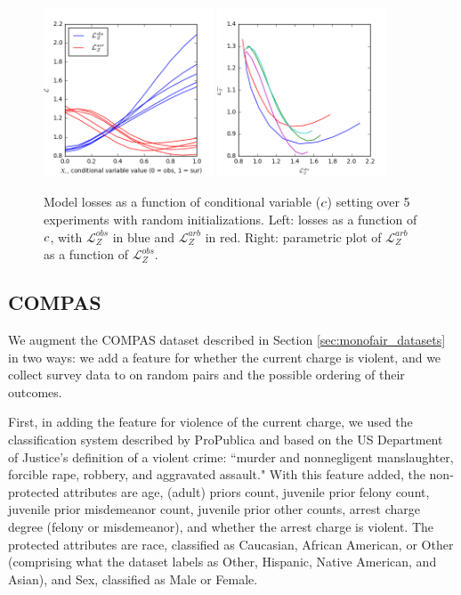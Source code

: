        \begin{figure}
            \centering
            \includegraphics[width=0.45\textwidth]{fig_softmono/synthetic_loss.png}
            \includegraphics[width=0.45\textwidth]{fig_softmono/synthetic_loss_tradeoff.png}
            \caption{
                Model losses as a function of conditional variable ($c$) setting over 5 experiments with random initializations.  Left: losses as a function of $c$, with $\mathcal{L}_Z^{obs}$ in blue and $\mathcal{L}_Z^{arb}$ in red.  Right: parametric plot of $\mathcal{L}_Z^{arb}$ as a function of $\mathcal{L}_Z^{obs}$.
            }
            \label{fig:sm_synthetic_losses}
        \end{figure}
        
    \subsection{COMPAS}\label{subsec:sm_compas}
    
        We augment the COMPAS dataset described in Section \ref{sec:monofair_datasets} in two ways: we add a feature for whether the current charge is violent, and we collect survey data to on random pairs and the possible ordering of their outcomes.
        
        First, in adding the feature for violence of the current charge, we used the classification system described by ProPublica\cite{larson2016we} and based on the US Department of Justice's definition of a violent crime: ``murder and nonnegligent manslaughter, forcible rape, robbery, and aggravated assault."  With this feature added, the non-protected attributes are age, (adult) priors count, juvenile prior felony count, juvenile prior misdemeanor count, juvenile prior other counts, arrest charge degree (felony or misdemeanor), and whether the arrest charge is violent.  The protected attributes are race, classified as Caucasian, African American, or Other (comprising what the dataset labels as Other, Hispanic, Native American, and Asian), and Sex, classified as Male or Female.
        
